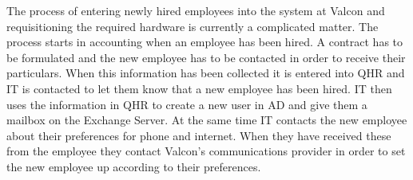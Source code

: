 The process of entering newly hired employees into the system at Valcon 
and requisitioning the required hardware is currently a complicated matter.
The process starts in accounting when an employee has been hired.
A contract has to be formulated and the new employee has to be contacted in order to receive their particulars.
When this information has been collected it is entered into QHR and IT is contacted to let them know that a new employee has been hired.
IT then uses the information in QHR to create a new user in AD and give them a mailbox on the Exchange Server.
At the same time IT contacts the new employee about their preferences for phone and internet.
When they have received these from the employee they contact Valcon's communications provider in order to set the new employee up according to their preferences.
